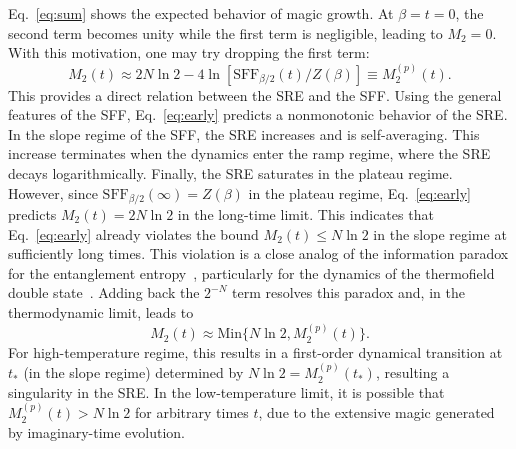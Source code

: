 \documentclass[aps,prl,twocolumn,superscriptaddress,longbibliography]{revtex4-2}
\begin{document}
 Eq.~\eqref{eq:sum} shows the expected behavior of magic growth. At $\beta=t=0$, the second term becomes unity while the first term is negligible, leading to $M_2=0$. With this motivation, one may try dropping the first term:
 \begin{equation}\label{eq:early}
 M_2(t)\approx 2N\ln 2-4\ln \left[\text{SFF}_{{\beta}/{2}}(t)/Z(\beta)\right]\equiv M_2^{(p)}(t).
 \end{equation}
 This provides a direct relation between the SRE and the SFF. Using the general features of the SFF, Eq.~\eqref{eq:early} predicts a nonmonotonic behavior of the SRE. In the slope regime of the SFF, the SRE increases and is self-averaging. This increase terminates when the dynamics enter the ramp regime, where the SRE decays logarithmically. Finally, the SRE saturates in the plateau regime. However, since $\mathrm{SFF}_{\beta/2}(\infty)=Z(\beta)$ in the plateau regime, Eq.~\eqref{eq:early} predicts $M_2(t)=2N\ln 2$ in the long-time limit. This indicates that Eq.~\eqref{eq:early} already violates the bound $M_2(t)\leq N\ln 2$ in the slope regime at sufficiently long times. This violation is a close analog of the information paradox for the entanglement entropy~\cite{PhysRevD.14.2460}, particularly for the dynamics of the thermofield double state~\cite{Almheiri:2019yqk,Chen:2020wiq}. Adding back the $2^{-N}$ term resolves this paradox and, in the thermodynamic limit, leads to
 \begin{equation}\label{eq:full}
  M_2(t)\approx \text{Min}\{N\ln 2, M_2^{(p)}(t)\}.
 \end{equation}
 For high-temperature regime, this results in a first-order dynamical transition at $t_*$ (in the slope regime) determined by $N\ln 2=M_2^{(p)}(t_*)$, resulting a singularity in the SRE. In the low-temperature limit, it is possible that $M_2^{(p)}(t) > N\ln 2$ for arbitrary times $t$, due to the extensive magic generated by imaginary-time evolution.
\end{document}
